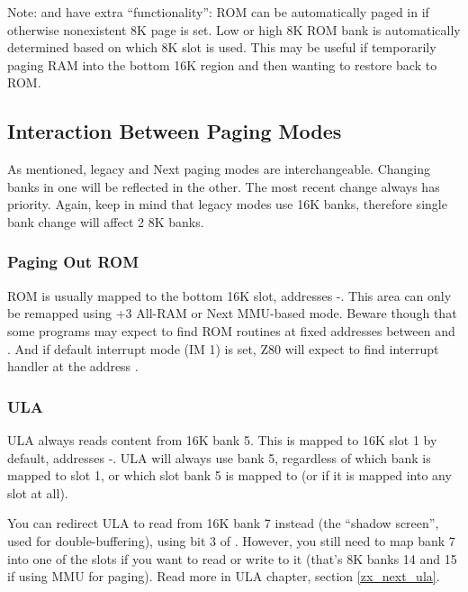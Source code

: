 Note:  and  have extra ``functionality'': ROM can be automatically paged in if otherwise nonexistent 8K page  is set. Low or high 8K ROM bank is automatically determined based on which 8K slot is used. This may be useful if temporarily paging RAM into the bottom 16K region and then wanting to restore back to ROM.


\subsection{Interaction Between Paging Modes}

As mentioned, legacy and Next paging modes are interchangeable. Changing banks in one will be reflected in the other. The most recent change always has priority. Again, keep in mind that legacy modes use 16K banks, therefore single bank change will affect 2 8K banks.


\subsubsection{Paging Out ROM}

ROM is usually mapped to the bottom 16K slot, addresses -. This area can only be remapped using +3 All-RAM or Next MMU-based mode. Beware though that some programs may expect to find ROM routines at fixed addresses between  and . And if default interrupt mode (IM 1) is set, Z80 will expect to find interrupt handler at the address .


\subsubsection{ULA}

ULA always reads content from 16K bank 5. This is mapped to 16K slot 1 by default, addresses -. ULA will always use bank 5, regardless of which bank is mapped to slot 1, or which slot bank 5 is mapped to (or if it is mapped into any slot at all).

You can redirect ULA to read from 16K bank 7 instead (the ``shadow screen'', used for double-buffering), using bit 3 of . However, you still need to map bank 7 into one of the slots if you want to read or write to it (that's 8K banks 14 and 15 if using MMU for paging). Read more in ULA chapter, section \ref{zx_next_ula}.


